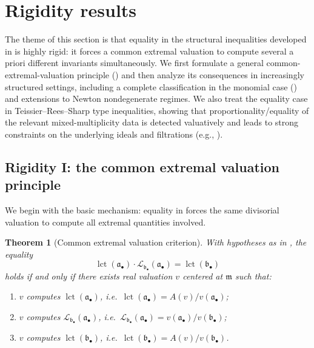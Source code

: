 \documentclass[12pt]{amsart}
\newcommand{\m}{\mathfrak m}
\renewcommand{\a}{\mathfrak{a}}
\renewcommand{\b}{\mathfrak{b}}
\newcommand{\lct}{\operatorname{\mathrm{lct}}}
\newcommand{\Loj}{\mathcal{L}} %
\newcommand{\abul}{{\a_\bullet}}
\newcommand{\bbul}{{\b_\bullet}}
\theoremstyle{plain}
\newtheorem{theorem}{Theorem}[section]
\theoremstyle{definition}
\numberwithin{equation}{section}
\begin{document}
\section{Rigidity results} \label{sec:rigidity}

The theme of this section is that equality in the structural inequalities developed in  is highly rigid: it forces a common extremal valuation to compute several a priori different invariants simultaneously.  We first formulate a general common-extremal-valuation principle () and then analyze its consequences in increasingly structured settings, including a complete classification in the monomial case () and extensions to Newton nondegenerate regimes.  We also treat the equality case in Teissier--Rees--Sharp type inequalities, showing that proportionality/equality of the relevant mixed-multiplicity data is detected valuatively and leads to strong constraints on the underlying ideals and filtrations (e.g., ).

\subsection{Rigidity I: the common extremal valuation principle}\label{subsec:rigidity-common-extremal}

We begin with the basic mechanism: equality in  forces the same
divisorial valuation to compute all extremal quantities involved.

\begin{theorem}[Common extremal valuation criterion]\label{thm:common-valuation}
With hypotheses as in , the equality
\[
\lct(\abul)\cdot \Loj_{\bbul}(\abul)=\lct(\bbul)
\]
holds if and only if there exists real valuation $v$ centered at $\m$ such that:
\begin{enumerate}[label=(\alph*),leftmargin=2em]
\item $v$ computes $\lct(\abul)$, i.e.\ $\lct(\abul)=A(v)/v(\abul)$;
\item $v$ computes $\Loj_{\bbul}(\abul)$, i.e.\ $\Loj_{\bbul}(\abul)=v(\abul)/v(\bbul)$;
\item $v$ computes $\lct(\bbul)$, i.e.\ $\lct(\bbul)=A(v)/v(\bbul)$.
\end{enumerate}
\end{theorem}
\end{document}
